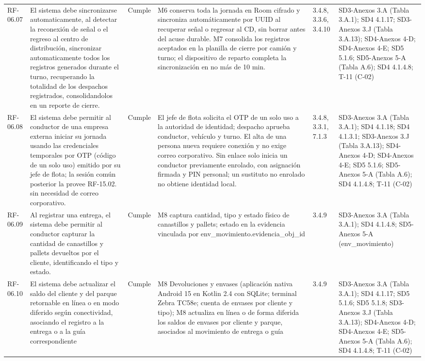 \documentclass[carta,firma,final]{lafrox}
\begin{document}
\begin{landscape}
{\begin{longtable}{@{}F{0.070} F{0.255} F{0.075} F{0.280} F{0.090} F{0.230}@{}}
  RF-06.07 & El sistema debe sincronizarse automaticamente, al detectar la reconexión de señal o el regreso al centro de distribución, sincronizar automaticamente todos los registros generados durante el turno, recuperando la totalidad de los despachos registrados, consolidandolos en un reporte de cierre. & Cumple & M6 conserva toda la jornada en Room cifrado y sincroniza automáticamente por UUID al recuperar señal o regresar al CD, sin borrar antes del acuse durable. M7 consolida los registros aceptados en la planilla de cierre por camión y turno; el dispositivo de reparto completa la sincronización en no más de 10 min. & 3.4.8, 3.3.6, 3.4.10 & SD3-Anexos 3.A (Tabla 3.A.1); SD4 4.1.17; SD3-Anexos 3.J (Tabla 3.A.13); SD4-Anexos 4-D; SD4-Anexos 4-E; SD5 5.1.6; SD5-Anexos 5-A (Tabla A.6); SD4 4.1.4.8; T-11 (C-02) \\
  RF-06.08 & El sistema debe permitir al conductor de una empresa externa iniciar su jornada usando las credenciales temporales por OTP (código de un solo uso) emitido por su jefe de flota; la sesión común posterior la provee RF-15.02. sin necesidad de correo corporativo. & Cumple & El jefe de flota solicita el OTP de un solo uso a la autoridad de identidad; despacho aprueba conductor, vehículo y turno. El alta de una persona nueva requiere conexión y no exige correo corporativo. Sin enlace solo inicia un conductor previamente enrolado, con asignación firmada y PIN personal; un sustituto no enrolado no obtiene identidad local. & 3.4.8, 3.3.1, 7.1.3 & SD3-Anexos 3.A (Tabla 3.A.1); SD4 4.1.18; SD4 4.1.3.1; SD3-Anexos 3.J (Tabla 3.A.13); SD4-Anexos 4-D; SD4-Anexos 4-E; SD5 5.1.6; SD5-Anexos 5-A (Tabla A.6); SD4 4.1.4.8; T-11 (C-02) \\
  RF-06.09 & Al registrar una entrega, el sistema debe permitir al conductor capturar la cantidad de canastillos y pallets devueltos por el cliente, identificando el tipo y estado. & Cumple & M8 captura cantidad, tipo y estado físico de canastillos y pallets; estado en la evidencia vinculada por env\_movimiento.evidencia\_obj\_id & 3.4.9 & SD3-Anexos 3.A (Tabla 3.A.1); SD4 4.1.4.8; SD5-Anexos 5-A (env\_movimiento) \\
  RF-06.10 & El sistema debe actualizar el saldo del cliente y del parque retornable en línea o en modo diferido según conectividad, asociando el registro a la entrega o a la guía correspondiente & Cumple & M8 Devoluciones y envases (aplicación nativa Android 15 en Kotlin 2.4 con SQLite; terminal Zebra TC58e; cuenta de envases por cliente y tipo); M8 actualiza en línea o de forma diferida los saldos de envases por cliente y parque, asociados al movimiento de entrega o guía & 3.4.9 & SD3-Anexos 3.A (Tabla 3.A.1); SD4 4.1.17; SD5 5.1.6; SD5 5.1.8; SD3-Anexos 3.J (Tabla 3.A.13); SD4-Anexos 4-D; SD4-Anexos 4-E; SD5-Anexos 5-A (Tabla A.6); SD4 4.1.4.8; T-11 (C-02) \\

\end{longtable}}
\end{landscape}
\end{document}
